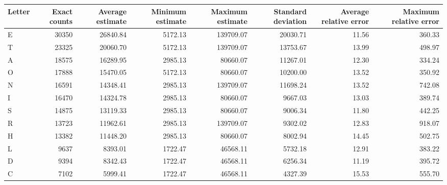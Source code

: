 \begin{tabular}{lrrrrrrr}
\toprule
Letter &  Exact counts &  Average estimate &  Minimum estimate &  Maximum estimate &  Standard deviation &  Average relative error &  Maximum relative error \\
\midrule
     E &         30350 &          26840.84 &           5172.13 &         139709.07 &            20030.71 &                   11.56 &                  360.33 \\
     T &         23325 &          20060.70 &           5172.13 &         139709.07 &            13753.67 &                   13.99 &                  498.97 \\
     A &         18575 &          16289.95 &           2985.13 &          80660.07 &            11267.01 &                   12.30 &                  334.24 \\
     O &         17888 &          15470.05 &           5172.13 &          80660.07 &            10200.00 &                   13.52 &                  350.92 \\
     N &         16591 &          14348.41 &           2985.13 &         139709.07 &            11698.24 &                   13.52 &                  742.08 \\
     I &         16470 &          14324.78 &           2985.13 &          80660.07 &             9667.03 &                   13.03 &                  389.74 \\
     S &         14875 &          13119.33 &           2985.13 &          80660.07 &             9006.34 &                   11.80 &                  442.25 \\
     R &         13723 &          11962.61 &           2985.13 &         139709.07 &             9302.02 &                   12.83 &                  918.07 \\
     H &         13382 &          11448.20 &           2985.13 &          80660.07 &             8002.94 &                   14.45 &                  502.75 \\
     L &          9637 &           8393.01 &           1722.47 &          46568.11 &             5732.18 &                   12.91 &                  383.22 \\
     D &          9394 &           8342.43 &           1722.47 &          46568.11 &             6256.34 &                   11.19 &                  395.72 \\
     C &          7102 &           5999.41 &           1722.47 &          46568.11 &             4327.39 &                   15.53 &                  555.70 \\

\end{tabular}
